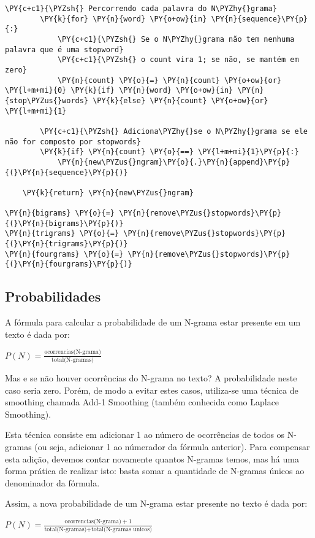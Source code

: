 \documentclass[a4paper,11pt,final]{article}
\begin{document}
\begin{Verbatim}[commandchars=\\\{\},frame=single,fontsize=\small, xleftmargin=0.5em]
        \PY{c+c1}{\PYZsh{} Percorrendo cada palavra do N\PYZhy{}grama}
        \PY{k}{for} \PY{n}{word} \PY{o+ow}{in} \PY{n}{sequence}\PY{p}{:}
            \PY{c+c1}{\PYZsh{} Se o N\PYZhy{}grama não tem nenhuma palavra que é uma stopword}
            \PY{c+c1}{\PYZsh{} o count vira 1; se não, se mantém em zero}
            \PY{n}{count} \PY{o}{=} \PY{n}{count} \PY{o+ow}{or} \PY{l+m+mi}{0} \PY{k}{if} \PY{n}{word} \PY{o+ow}{in} \PY{n}{stop\PYZus{}words} \PY{k}{else} \PY{n}{count} \PY{o+ow}{or} \PY{l+m+mi}{1}

        \PY{c+c1}{\PYZsh{} Adiciona\PYZhy{}se o N\PYZhy{}grama se ele não for composto por stopwords}
        \PY{k}{if} \PY{n}{count} \PY{o}{==} \PY{l+m+mi}{1}\PY{p}{:}
            \PY{n}{new\PYZus{}ngram}\PY{o}{.}\PY{n}{append}\PY{p}{(}\PY{n}{sequence}\PY{p}{)}
            
    \PY{k}{return} \PY{n}{new\PYZus{}ngram}

\PY{n}{bigrams} \PY{o}{=} \PY{n}{remove\PYZus{}stopwords}\PY{p}{(}\PY{n}{bigrams}\PY{p}{)}
\PY{n}{trigrams} \PY{o}{=} \PY{n}{remove\PYZus{}stopwords}\PY{p}{(}\PY{n}{trigrams}\PY{p}{)}
\PY{n}{fourgrams} \PY{o}{=} \PY{n}{remove\PYZus{}stopwords}\PY{p}{(}\PY{n}{fourgrams}\PY{p}{)}
\end{Verbatim}


\subsection{Probabilidades}

A fórmula para calcular a probabilidade de um N-grama estar presente em um texto é dada por:

$P(N) = \frac{\text{ocorrencias(N-grama)}}{\text{total(N-gramas)}}$

Mas e se não houver ocorrências do N-grama no texto? A probabilidade neste caso seria zero.
Porém, de modo a evitar estes casos, utiliza-se uma técnica de smoothing chamada Add-1 Smoothing (também conhecida como Laplace Smoothing).

Esta técnica consiste em adicionar 1 ao número de ocorrências de todos os N-gramas (ou seja, adicionar 1 ao númerador da fórmula anterior).
Para compensar esta adição, devemos contar novamente quantos N-gramas temos, mas há uma forma prática de realizar isto: basta somar a quantidade de N-gramas únicos ao denominador da fórmula.

Assim, a nova probabilidade de um N-grama estar presente no texto é dada por:

$P(N) = \frac{\text{ocorrencias(N-grama)} + 1}{\text{total(N-gramas)} + \text{total(N-gramas unicos)}}$
\end{document}
